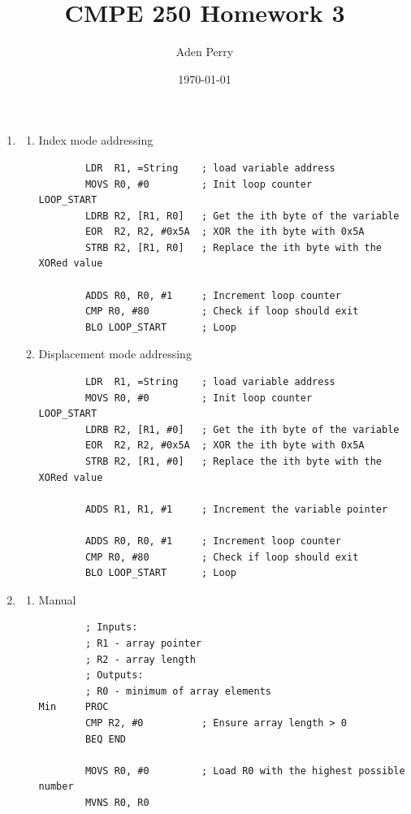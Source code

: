 \documentclass{article}
\title{CMPE 250 Homework 3}
\author{Aden Perry}
\date{\today}
\begin{document}
\maketitle

\begin{enumerate}
	\item
	      \begin{enumerate}
		      \item Index mode addressing
		            \begin{verbatim}
        LDR  R1, =String    ; load variable address
        MOVS R0, #0         ; Init loop counter
LOOP_START
        LDRB R2, [R1, R0]   ; Get the ith byte of the variable
        EOR  R2, R2, #0x5A  ; XOR the ith byte with 0x5A
        STRB R2, [R1, R0]   ; Replace the ith byte with the XORed value

        ADDS R0, R0, #1     ; Increment loop counter
        CMP R0, #80         ; Check if loop should exit
        BLO LOOP_START      ; Loop
\end{verbatim}

		      \item Displacement mode addressing
		            \begin{verbatim}
        LDR  R1, =String    ; load variable address
        MOVS R0, #0         ; Init loop counter
LOOP_START
        LDRB R2, [R1, #0]   ; Get the ith byte of the variable
        EOR  R2, R2, #0x5A  ; XOR the ith byte with 0x5A
        STRB R2, [R1, #0]   ; Replace the ith byte with the XORed value

        ADDS R1, R1, #1     ; Increment the variable pointer

        ADDS R0, R0, #1     ; Increment loop counter
        CMP R0, #80         ; Check if loop should exit
        BLO LOOP_START      ; Loop
\end{verbatim}
	      \end{enumerate}

	\item
	      \begin{enumerate}
		      \item Manual
		            \begin{verbatim}
        ; Inputs:
        ; R1 - array pointer
        ; R2 - array length
        ; Outputs:
        ; R0 - minimum of array elements
Min     PROC
        CMP R2, #0          ; Ensure array length > 0
        BEQ END

        MOVS R0, #0         ; Load R0 with the highest possible number
        MVNS R0, R0
        

\end{verbatim}
\end{enumerate}
\end{enumerate}
\end{document}
